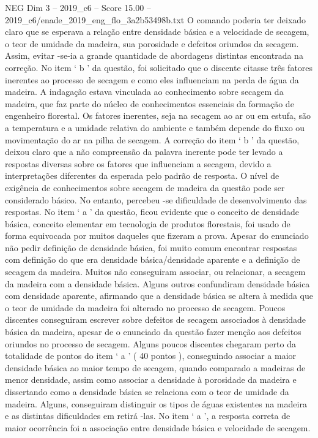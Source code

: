 \begin{textsample}{NEG Dim 3 – 2019\_c6 – Score 15.00 – 2019\_c6/enade\_2019\_eng\_flo\_3a2b53498b.txt}
O comando poderia ter deixado claro que se esperava a relação entre densidade básica e a velocidade de secagem, o teor de umidade da madeira, sua porosidade e defeitos oriundos da secagem.
Assim, evitar -se-ia a grande quantidade de abordagens distintas encontrada na correção.
No item ‘ b ’ da questão, foi solicitado que o discente citasse três fatores inerentes ao processo de secagem e como eles influenciam na perda de água da madeira.
A indagação estava vinculada ao conhecimento sobre secagem da madeira, que faz parte do núcleo de conhecimentos essenciais da formação de engenheiro florestal.
Os fatores inerentes, seja na secagem ao ar ou em estufa, são a temperatura e a umidade relativa do ambiente e também depende do fluxo ou movimentação do ar na pilha de secagem.
A correção do item ‘ b ’ da questão, deixou claro que a não compreensão da palavra inerente pode ter levado a respostas diversas sobre os fatores que influenciam a secagem, devido a interpretações diferentes da esperada pelo padrão de resposta.
O nível de exigência de conhecimentos sobre secagem de madeira da questão pode ser considerado básico.
No entanto, percebeu -se dificuldade de desenvolvimento das respostas.
No item ‘ a ’ da questão, ficou evidente que o conceito de densidade básica, conceito elementar em tecnologia de produtos florestais, foi usado de forma equivocada por muitos daqueles que fizeram a prova.
Apesar do enunciado não pedir definição de densidade básica, foi muito comum encontrar respostas com definição do que era densidade básica/densidade aparente e a definição de secagem da madeira.
Muitos não conseguiram associar, ou relacionar, a secagem da madeira com a densidade básica.
Alguns outros confundiram densidade básica com densidade aparente, afirmando que a densidade básica se altera à medida que o teor de umidade da madeira foi alterado no processo de secagem.
Poucos discentes conseguiram escrever sobre defeitos de secagem associados à densidade básica da madeira, apesar de o enunciado da questão fazer menção aos defeitos oriundos no processo de secagem.
Alguns poucos discentes chegaram perto da totalidade de pontos do item ‘ a ’ ( 40 pontos ), conseguindo associar a maior densidade básica ao maior tempo de secagem, quando comparado a madeiras de menor densidade, assim como associar a densidade à porosidade da madeira e dissertando como a densidade básica se relaciona com o teor de umidade da madeira.
Alguns, conseguiram distinguir os tipos de águas existentes na madeira e as distintas dificuldades em retirá -las.
No item ‘ a ’, a resposta correta de maior ocorrência foi a associação entre densidade básica e velocidade de secagem.

\end{textsample}
